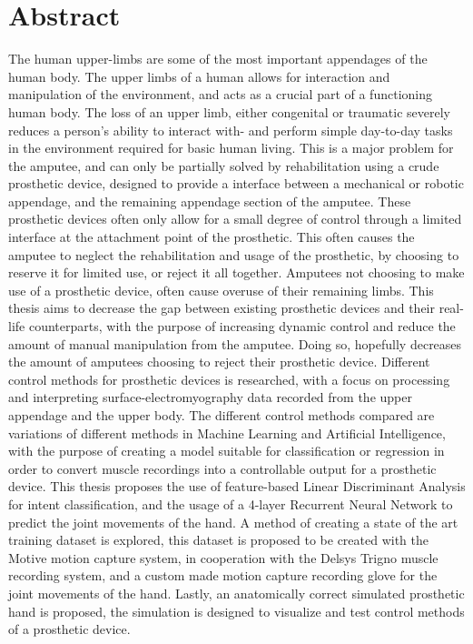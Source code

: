 \documentclass[../main.tex]{subfiles}
\begin{document}
\section*{Abstract}

The human upper-limbs are some of the most important appendages of the human body.
The upper limbs of a human allows for interaction and manipulation of the environment, and acts as a crucial part of a functioning human body.
The loss of an upper limb, either congenital or traumatic severely reduces a person's ability to interact with- and perform simple day-to-day tasks in the environment required for basic human living.
This is a major problem for the amputee, and can only be partially solved by rehabilitation using a crude prosthetic device, designed to provide a interface between a mechanical or robotic appendage, and the remaining appendage section of the amputee.
These prosthetic devices often only allow for a small degree of control through a limited interface at the attachment point of the prosthetic.
This often causes the amputee to neglect the rehabilitation and usage of the prosthetic, by choosing to reserve it for limited use, or reject it all together.
Amputees not choosing to make use of a prosthetic device, often cause overuse of their remaining limbs.
This thesis aims to decrease the gap between existing prosthetic devices and their real-life counterparts, with the purpose of increasing dynamic control and reduce the amount of manual manipulation from the amputee.
Doing so, hopefully decreases the amount of amputees choosing to reject their prosthetic device. 
Different control methods for prosthetic devices is researched, with a focus on processing and interpreting surface-electromyography data recorded from the upper appendage and the upper body.
The different control methods compared are variations of different methods in Machine Learning and Artificial Intelligence, with the purpose of creating a model suitable for classification or regression in order to convert muscle recordings into a controllable output for a prosthetic device.
This thesis proposes the use of feature-based Linear Discriminant Analysis for intent classification, and the usage of a 4-layer Recurrent Neural Network to predict the joint movements of the hand.
A method of creating a state of the art training dataset is explored, this dataset is proposed to be created with the Motive motion capture system, in cooperation with the Delsys Trigno muscle recording system, and a custom made motion capture recording glove for the joint movements of the hand.
Lastly, an anatomically correct simulated prosthetic hand is proposed, the simulation is designed to visualize and test control methods of a prosthetic device.


\end{document}
